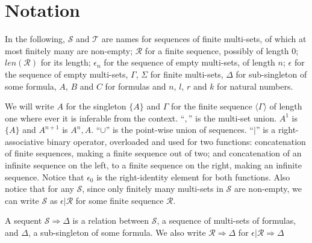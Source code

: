 \section{Notation} In the following, $\mathcal{S}$ and $\mathcal{T}$ are names for sequences of finite multi-sets, of which at most finitely many are non-empty; $\mathcal{R}$ for a finite sequence, possibly of length $0$; $len(\mathcal{R})$ for its length; $\epsilon_n$ for the sequence of empty multi-sets, of length $n$; $\epsilon$ for the sequence of empty multi-sets, $\Gamma$, $\Sigma$ for finite multi-sets, $\Delta$ for sub-singleton of some formula, $A$, $B$ and $C$ for formulas and $n$, $l$, $r$ and $k$ for natural numbers.

We will write $A$ for the singleton $\{A\}$ and $\Gamma$ for the finite sequence $\langle\Gamma\rangle$ of length one where ever it is inferable from the context.
``$,$'' is the multi-set union.
$A^1$ is $\{A\}$ and $A^{n+1}$ is $A^n, A$.
``$\cup$'' is the point-wise union of sequences.
``$|$'' is a right-associative binary operator, overloaded and used for two functions: concatenation of finite sequences, making a finite sequence out of two; and concatenation of an infinite sequence on the left, to a finite sequence on the right, making an infinite sequence. Notice that $\epsilon_0$ is the right-identity element for both functions. Also notice that for any $\mathcal{S}$, since only finitely many multi-sets in $\mathcal{S}$ are non-empty, we can write $\mathcal{S}$ as $\epsilon | \mathcal{R}$ for some finite sequence $\mathcal{R}$.

A sequent $\mathcal{S} \Rightarrow \Delta$ is a relation between $\mathcal{S}$, a sequence of multi-sets of formulas, and $\Delta$, a sub-singleton of some formula. We also write $\mathcal{R} \Rightarrow \Delta$ for $\epsilon | \mathcal{R} \Rightarrow \Delta$

